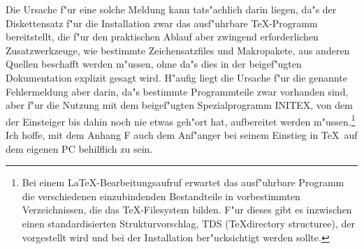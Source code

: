 Die Ursache f"ur eine solche Meldung kann tats"achlich darin liegen, da"s
der Diskettensatz f"ur die Installation zwar das ausf"uhrbare \TeX-Programm
bereitstellt, die f"ur den praktischen Ablauf aber zwingend erforderlichen
Zusatzwerkzeuge, wie bestimmte Zeichensatzfiles und Makropakete, aus anderen
Quellen beschafft werden m"ussen, ohne da"s dies in der beigef"ugten
Dokumentation explizit gesagt wird. H"aufig liegt die Ursache f"ur die
genannte Fehlermeldung aber darin, da"s bestimmte Programmteile zwar vorhanden
sind, aber f"ur die Nutzung mit dem beigef"ugten Spezialprogramm INITEX, 
von dem der Einsteiger bis dahin noch nie etwas geh"ort hat, aufbereitet werden
m"ussen.\footnote{Bei einem \LaTeX-Bearbeitungsaufruf erwartet das ausf"uhrbare
Programm die verschiedenen einzubindenden Bestandteile in vorbestimmten
Verzeichnissen, die das \TeX-Filesystem bilden. F"ur dieses gibt es inzwischen
einen standardisierten Strukturvorschlag, TDS (\TeX directory structuree),
der vorgestellt wird und bei der Installation ber"ucksichtigt werden sollte.}
Ich hoffe, mit dem Anhang F auch dem Anf"anger bei seinem Einstieg in \TeX\
auf dem eigenen PC behilflich  zu sein.

